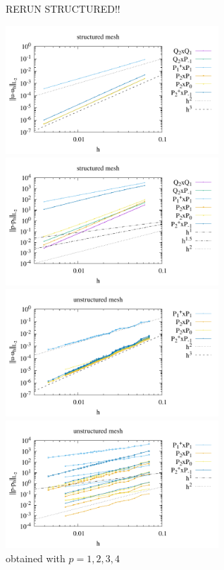 RERUN STRUCTURED!!

\begin{center}
\includegraphics[width=8cm]{python_codes/fieldstone_120/paperresults/jokn16_structured_errorsV.pdf}
\includegraphics[width=8cm]{python_codes/fieldstone_120/paperresults/jokn16_structured_errorsP.pdf}\\
\includegraphics[width=8cm]{python_codes/fieldstone_120/paperresults/jokn16_unstructured_errorsV.pdf}
\includegraphics[width=8cm]{python_codes/fieldstone_120/paperresults/jokn16_unstructured_errorsP.pdf}\\
{\captionfont obtained with $p=1,2,3,4$}
\end{center}







